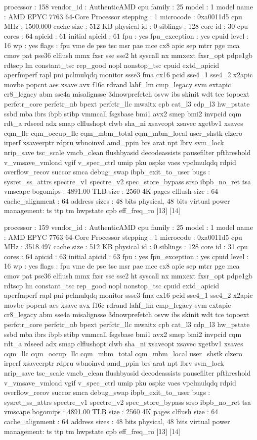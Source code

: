 processor	: 158
vendor_id	: AuthenticAMD
cpu family	: 25
model		: 1
model name	: AMD EPYC 7763 64-Core Processor
stepping	: 1
microcode	: 0xa0011d5
cpu MHz		: 1500.000
cache size	: 512 KB
physical id	: 0
siblings	: 128
core id		: 30
cpu cores	: 64
apicid		: 61
initial apicid	: 61
fpu		: yes
fpu_exception	: yes
cpuid level	: 16
wp		: yes
flags		: fpu vme de pse tsc msr pae mce cx8 apic sep mtrr pge mca cmov pat pse36 clflush mmx fxsr sse sse2 ht syscall nx mmxext fxsr_opt pdpe1gb rdtscp lm constant_tsc rep_good nopl nonstop_tsc cpuid extd_apicid aperfmperf rapl pni pclmulqdq monitor ssse3 fma cx16 pcid sse4_1 sse4_2 x2apic movbe popcnt aes xsave avx f16c rdrand lahf_lm cmp_legacy svm extapic cr8_legacy abm sse4a misalignsse 3dnowprefetch osvw ibs skinit wdt tce topoext perfctr_core perfctr_nb bpext perfctr_llc mwaitx cpb cat_l3 cdp_l3 hw_pstate ssbd mba ibrs ibpb stibp vmmcall fsgsbase bmi1 avx2 smep bmi2 invpcid cqm rdt_a rdseed adx smap clflushopt clwb sha_ni xsaveopt xsavec xgetbv1 xsaves cqm_llc cqm_occup_llc cqm_mbm_total cqm_mbm_local user_shstk clzero irperf xsaveerptr rdpru wbnoinvd amd_ppin brs arat npt lbrv svm_lock nrip_save tsc_scale vmcb_clean flushbyasid decodeassists pausefilter pfthreshold v_vmsave_vmload vgif v_spec_ctrl umip pku ospke vaes vpclmulqdq rdpid overflow_recov succor smca debug_swap ibpb_exit_to_user
bugs		: sysret_ss_attrs spectre_v1 spectre_v2 spec_store_bypass srso ibpb_no_ret tsa vmscape
bogomips	: 4891.00
TLB size	: 2560 4K pages
clflush size	: 64
cache_alignment	: 64
address sizes	: 48 bits physical, 48 bits virtual
power management: ts ttp tm hwpstate cpb eff_freq_ro [13] [14]

processor	: 159
vendor_id	: AuthenticAMD
cpu family	: 25
model		: 1
model name	: AMD EPYC 7763 64-Core Processor
stepping	: 1
microcode	: 0xa0011d5
cpu MHz		: 3518.497
cache size	: 512 KB
physical id	: 0
siblings	: 128
core id		: 31
cpu cores	: 64
apicid		: 63
initial apicid	: 63
fpu		: yes
fpu_exception	: yes
cpuid level	: 16
wp		: yes
flags		: fpu vme de pse tsc msr pae mce cx8 apic sep mtrr pge mca cmov pat pse36 clflush mmx fxsr sse sse2 ht syscall nx mmxext fxsr_opt pdpe1gb rdtscp lm constant_tsc rep_good nopl nonstop_tsc cpuid extd_apicid aperfmperf rapl pni pclmulqdq monitor ssse3 fma cx16 pcid sse4_1 sse4_2 x2apic movbe popcnt aes xsave avx f16c rdrand lahf_lm cmp_legacy svm extapic cr8_legacy abm sse4a misalignsse 3dnowprefetch osvw ibs skinit wdt tce topoext perfctr_core perfctr_nb bpext perfctr_llc mwaitx cpb cat_l3 cdp_l3 hw_pstate ssbd mba ibrs ibpb stibp vmmcall fsgsbase bmi1 avx2 smep bmi2 invpcid cqm rdt_a rdseed adx smap clflushopt clwb sha_ni xsaveopt xsavec xgetbv1 xsaves cqm_llc cqm_occup_llc cqm_mbm_total cqm_mbm_local user_shstk clzero irperf xsaveerptr rdpru wbnoinvd amd_ppin brs arat npt lbrv svm_lock nrip_save tsc_scale vmcb_clean flushbyasid decodeassists pausefilter pfthreshold v_vmsave_vmload vgif v_spec_ctrl umip pku ospke vaes vpclmulqdq rdpid overflow_recov succor smca debug_swap ibpb_exit_to_user
bugs		: sysret_ss_attrs spectre_v1 spectre_v2 spec_store_bypass srso ibpb_no_ret tsa vmscape
bogomips	: 4891.00
TLB size	: 2560 4K pages
clflush size	: 64
cache_alignment	: 64
address sizes	: 48 bits physical, 48 bits virtual
power management: ts ttp tm hwpstate cpb eff_freq_ro [13] [14]

